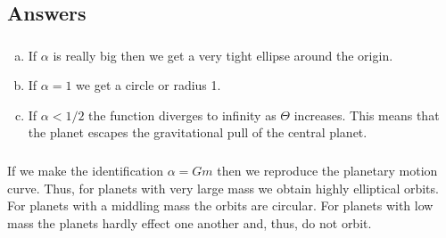 \documentclass[]{article}
\begin{document}
\begin{Answ}
\subsection{Answers}
\subsubsection{}
\begin{enumerate}[(a)]
\item  If $\alpha$ is really big then we get a very tight ellipse around the origin.
\item  If $\alpha=1$ we get a circle or radius 1.
\item  If $\alpha<1/2$ the function diverges to infinity as $\Theta$ increases. This means that the planet escapes the gravitational pull of the central planet.
\end{enumerate}
\subsubsection{}
If we make the identification $\alpha=Gm$ then we reproduce the planetary motion curve. Thus, for planets with very large mass we obtain highly elliptical orbits. For planets with a middling mass the orbits are circular. For planets with low mass the planets hardly effect one another and, thus, do not orbit.
\end{Answ}
\end{document}

